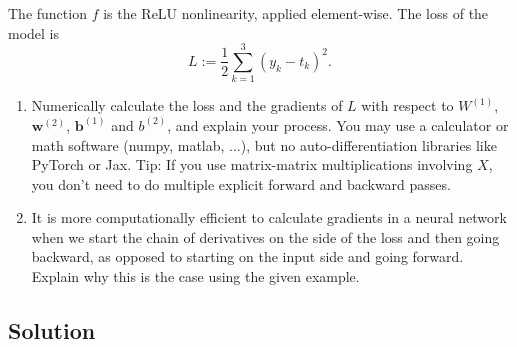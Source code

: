 \documentclass[a4paper,12pt]{article}
\begin{document}
The function $f$ is the ReLU nonlinearity, applied element-wise. The loss of the model is 
$$
    L := \frac{1}{2} \sum_{k=1}^3(y_k-t_k)^2.
$$
\begin{enumerate}
    \item Numerically calculate the loss and the gradients of $L$ with respect to $W^{(1)}$, $\mathbf{w}^{(2)}$, $\mathbf{b}^{(1)}$ and $b^{(2)}$, and explain your process.
    You may use a calculator or math software (numpy, matlab, ...), but no auto-differentiation libraries like PyTorch or Jax.
    Tip: If you use matrix-matrix multiplications involving $X$, you don't need to do multiple explicit forward and backward passes.
    \item It is more computationally efficient to calculate gradients in a neural network when we start the chain of derivatives on the side of the loss and then going backward, as opposed to starting on the input side and going forward.
    Explain why this is the case using the given example.
\end{enumerate}

\subsection{Solution}
\end{document}
